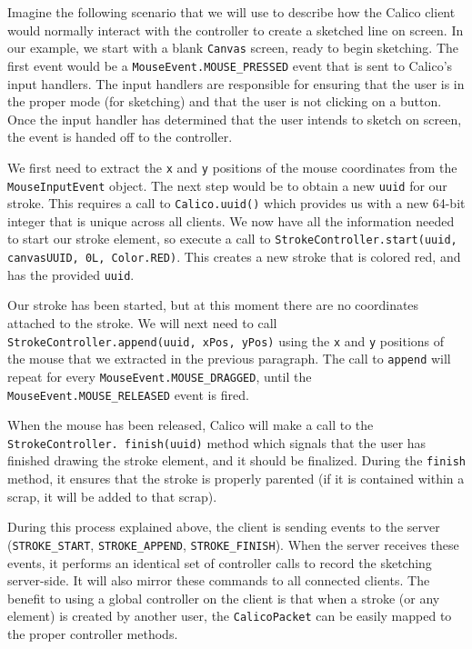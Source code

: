 Imagine the following scenario that we will use to describe how the Calico client would normally interact with the controller to create a sketched line on screen. In our example, we start with a blank \texttt{Canvas} screen, ready to begin sketching. The first event would be a \texttt{MouseEvent.MOUSE\_PRESSED} event that is sent to Calico's input handlers. The input handlers are responsible for ensuring that the user is in the proper mode (for sketching) and that the user is not clicking on a button. Once the input handler has determined that the user intends to sketch on screen, the event is handed off to the controller.

We first need to extract the \texttt{x} and \texttt{y} positions of the mouse coordinates from the \texttt{MouseInputEvent} object. The next step would be to obtain a new \texttt{uuid} for our stroke. This requires a call to \texttt{Calico.uuid()} which provides us with a new 64-bit integer that is unique across all clients. We now have all the information needed to start our stroke element, so execute a call to \texttt{StrokeController.start(uuid, canvasUUID, 0L, Color.RED)}. This creates a new stroke that is colored red, and has the provided \texttt{uuid}. 

Our stroke has been started, but at this moment there are no coordinates attached to the stroke. We will next need to call \texttt{StrokeController.append(uuid, xPos, yPos)} using the \texttt{x} and \texttt{y} positions of the mouse that we extracted in the previous paragraph. The call to \texttt{append} will repeat for every \texttt{MouseEvent.MOUSE\_DRAGGED}, until the \texttt{MouseEvent.MOUSE\_RELEASED} event is fired.

When the mouse has been released, Calico will make a call to the \texttt{StrokeController. finish(uuid)} method which signals that the user has finished drawing the stroke element, and it should be finalized. During the \texttt{finish} method, it ensures that the stroke is properly parented (if it is contained within a scrap, it will be added to that scrap).

During this process explained above, the client is sending events to the server (\texttt{STROKE\_START}, \texttt{STROKE\_APPEND}, \texttt{STROKE\_FINISH}). When the server receives these events, it performs an identical set of controller calls to record the sketching server-side. It will also mirror these commands to all connected clients. The benefit to using a global controller on the client is that when a stroke (or any element) is created by another user, the \texttt{CalicoPacket} can be easily mapped to the proper controller methods.